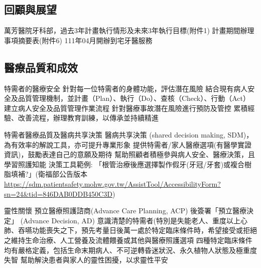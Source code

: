 \subsection{回顧與展望}
\begin{outline}
\1 萬芳醫院牙科部，過去3年計畫執行情形及未來3年執行目標(附件1)
\1 計畫期間辦理事項摘要表(附件6)
\1 111年04月開辦到宅牙醫服務
\end{outline}


\subsection{醫療品質和成效}

\begin{outline}

\1 特需者的醫療安全
    \2 針對每一位特需者的身體功能，評估潛在風險
    \2 結合現有病人安全及品質管理機制，並計畫（Plan）、執行（Do）、查核（Check）、行動（Act）
	\2 建立病人安全及品質管理作業流程
	\2 針對醫療事故潛在風險進行預防及管控
	\2 累積經驗、改善流程，辦理教育訓練，以傳承並持續精進
	
\1 特需者醫療品質及醫病共享決策
    \2 醫病共享決策 (shared decision making, SDM)，為有效率的解說工具，亦可提升專業形象
    \2 提供特需者/家人醫療選項(有醫學實證資訊)，鼓勵表達自己的意願及期待
    \2 幫助照顧者積極參與病人安全、醫療決策，且學習照護知能
    \2 決策工具範例: 「根管治療後應選擇製作假牙(牙冠/牙套)或複合樹脂填補?」(衛福部公告版本 \url{https://sdm.patientsafety.mohw.gov.tw/AssistTool/AccessibilityForm?sn=24&tid=846DAB0DDB450C3D})
    
\1 靈性關懷
    \2 預立醫療照護諮商(Advance Care Planning, ACP) 後簽署「預立醫療決定」 (Advance Decision, AD)
    \2 意識清楚的特需者(特別是失能老人、重度以上心肺、吞嚥功能喪失之下，預先考量日後萬一處於特定臨床條件時，希望接受或拒絕之維持生命治療、人工營養及流體餵養或其他與醫療照護選項
    \2 四種特定臨床條件均有嚴格定義，包括生命末期病人、不可逆轉昏迷狀況、永久植物人狀態及極重度失智
    \2 幫助解決患者與家人的靈性困擾，以求靈性平安

\end{outline}

